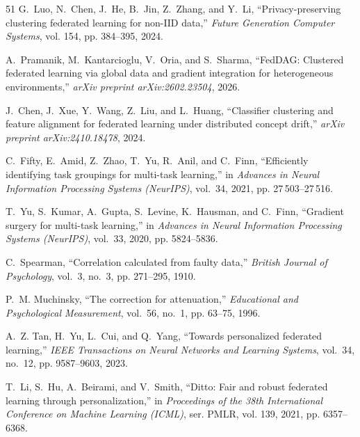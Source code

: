 \documentclass[journal]{IEEEtran}
\theoremstyle{definition}
\begin{document}
\begin{thebibliography}{51}
G.~Luo, N.~Chen, J.~He, B.~Jin, Z.~Zhang, and Y.~Li, ``Privacy-preserving
  clustering federated learning for non-{IID} data,'' \emph{Future Generation
  Computer Systems}, vol. 154, pp. 384--395, 2024.

A.~Pramanik, M.~Kantarcioglu, V.~Oria, and S.~Sharma, ``{FedDAG}: Clustered
  federated learning via global data and gradient integration for heterogeneous
  environments,'' \emph{arXiv preprint arXiv:2602.23504}, 2026.

J.~Chen, J.~Xue, Y.~Wang, Z.~Liu, and L.~Huang, ``Classifier clustering and
  feature alignment for federated learning under distributed concept drift,''
  \emph{arXiv preprint arXiv:2410.18478}, 2024.

C.~Fifty, E.~Amid, Z.~Zhao, T.~Yu, R.~Anil, and C.~Finn, ``Efficiently
  identifying task groupings for multi-task learning,'' in \emph{Advances in
  Neural Information Processing Systems (NeurIPS)}, vol.~34, 2021, pp.
  27\,503--27\,516.

T.~Yu, S.~Kumar, A.~Gupta, S.~Levine, K.~Hausman, and C.~Finn, ``Gradient
  surgery for multi-task learning,'' in \emph{Advances in Neural Information
  Processing Systems (NeurIPS)}, vol.~33, 2020, pp. 5824--5836.

C.~Spearman, ``Correlation calculated from faulty data,'' \emph{British Journal
  of Psychology}, vol.~3, no.~3, pp. 271--295, 1910.

P.~M. Muchinsky, ``The correction for attenuation,'' \emph{Educational and
  Psychological Measurement}, vol.~56, no.~1, pp. 63--75, 1996.

A.~Z. Tan, H.~Yu, L.~Cui, and Q.~Yang, ``Towards personalized federated
  learning,'' \emph{IEEE Transactions on Neural Networks and Learning Systems},
  vol.~34, no.~12, pp. 9587--9603, 2023.

T.~Li, S.~Hu, A.~Beirami, and V.~Smith, ``Ditto: Fair and robust federated
  learning through personalization,'' in \emph{Proceedings of the 38th
  International Conference on Machine Learning (ICML)}, ser. PMLR, vol. 139,
  2021, pp. 6357--6368.


\end{thebibliography}
\end{document}
